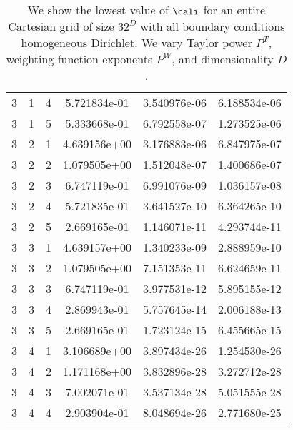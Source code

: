 \documentclass{article}
\begin{document}
{\begin{small}
\begin{table}
\begin{center}
\begin{tabular}{|ccc|ccc|}
3 & 1 & 4 & 5.721834e-01 & 3.540976e-06 & 6.188534e-06 \\ 
3 & 1 & 5 & 5.333668e-01 & 6.792558e-07 & 1.273525e-06 \\ 
3 & 2 & 1 & 4.639156e+00 & 3.176883e-06 & 6.847975e-07 \\ 
3 & 2 & 2 & 1.079505e+00 & 1.512048e-07 & 1.400686e-07 \\ 
3 & 2 & 3 & 6.747119e-01 & 6.991076e-09 & 1.036157e-08 \\ 
3 & 2 & 4 & 5.721835e-01 & 3.641527e-10 & 6.364265e-10 \\ 
3 & 2 & 5 & 2.669165e-01 & 1.146071e-11 & 4.293744e-11 \\ 
3 & 3 & 1 & 4.639157e+00 & 1.340233e-09 & 2.888959e-10 \\ 
3 & 3 & 2 & 1.079505e+00 & 7.151353e-11 & 6.624659e-11 \\ 
3 & 3 & 3 & 6.747119e-01 & 3.977531e-12 & 5.895155e-12 \\ 
3 & 3 & 4 & 2.869943e-01 & 5.757645e-14 & 2.006188e-13 \\ 
3 & 3 & 5 & 2.669165e-01 & 1.723124e-15 & 6.455665e-15 \\ 
3 & 4 & 1 & 3.106689e+00 & 3.897434e-26 & 1.254530e-26 \\ 
3 & 4 & 2 & 1.171168e+00 & 3.832896e-28 & 3.272712e-28 \\ 
3 & 4 & 3 & 7.002071e-01 & 3.537134e-28 & 5.051555e-28 \\ 
3 & 4 & 4 & 2.903904e-01 & 8.048694e-26 & 2.771680e-25 \\ 
\hline
\end{tabular}
\end{center}
\label{fig::allRegDiri}
\caption
    {
      We show the lowest value of
      $\cali$ for an entire Cartesian grid of size $32^D$ with all
      boundary conditions homogeneous Dirichlet.
      We vary Taylor power $P^T$, weighting
      function exponents $P^W$, and dimensionality $D$.
    }
\end{table}
\end{small}

}
\end{document}
